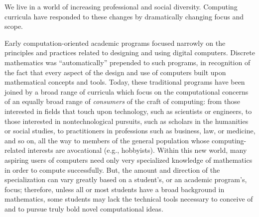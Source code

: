 

We live in a world of increasing professional and social diversity.  Computing curricula have responded to these changes by dramatically changing focus and scope.

\smallskip

Early computation-oriented academic programs focused narrowly on the principles and practices related to designing and using digital computers.  Discrete mathematics was ``automatically'' prepended to such programs, in recognition of the fact that every aspect of the design and use of computers built upon mathematical concepts and tools.  Today, these traditional programs have been joined by a broad range of curricula which focus on the computational concerns of an equally broad range of {\em consumers} of the craft of computing: from those interested in fields that touch upon technology, such as scientists or engineers, to those interested in nontechnological pursuits, such as scholars in the humanities or social studies, to practitioners in professions such as business, law, or medicine, and so on, all the way to members of the general population whose computing-related interests are avocational (e.g., hobbyists).  Within this new world, many aspiring users of computers need only very specialized knowledge of mathematics in order to compute successfully.  But, the amount and direction of the specialization can vary greatly based on a student's, or an academic program's, focus; therefore, unless all or most students have a broad background in mathematics, some students may lack the technical tools necessary to conceive of and to pursue truly bold novel computational ideas.

\bigskip

